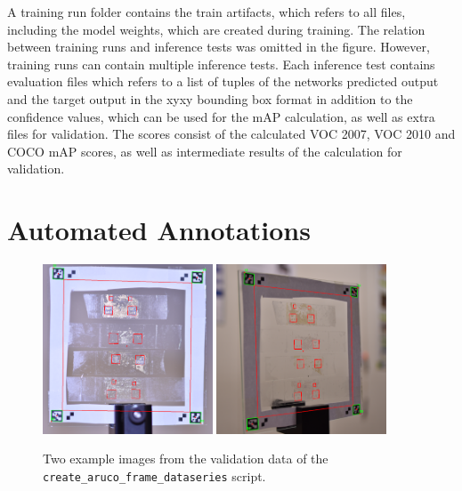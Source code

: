 \documentclass[10pt]{book}
\begin{document}
A training run folder contains the train artifacts, which refers to all files, including the model weights, which are created during training. The relation between training runs and inference tests was omitted in the figure. However, training runs can contain multiple inference tests. Each inference test contains evaluation files which refers to a list of tuples of the networks predicted output and the target output in the xyxy bounding box format in addition to the confidence values, which can be used for the \ac{mAP} calculation, as well as extra files for validation. The scores consist of the calculated VOC 2007, VOC 2010 and \ac{COCO} \ac{mAP} scores, as well as intermediate results of the calculation for validation.

\section{Automated Annotations}

\begin{figure}
  \centering
     {\includegraphics[width=0.45\textwidth]{image/af_markings_1}}
     {\includegraphics[width=0.45\textwidth]{image/af_markings_2}}
  \caption{Two example images from the validation data of the \texttt{create\_aruco\_frame\_dataseries} script.}
  \label{fig:af_markings}
\end{figure}
\end{document}
